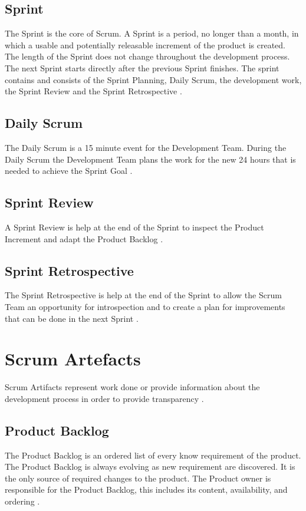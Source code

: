 \subsection{Sprint}
The Sprint is the core of Scrum. A Sprint is a period, no longer than a month, in which 
a usable and potentially releasable increment of the product is created. The length
of the Sprint does not change throughout the development process. The next Sprint 
starts directly after the previous Sprint finishes. The sprint contains and consists of the 
Sprint Planning, Daily Scrum, the development work, the Sprint Review and the 
Sprint Retrospective \parencite{TheScrumGuide}.

\subsection{Daily Scrum}
The Daily Scrum is a 15 minute event for the Development Team. During the Daily 
Scrum the Development Team plans the work for the new 24 hours that is needed
to achieve the Sprint Goal  \parencite{TheScrumGuide}.

\subsection{Sprint Review}
A Sprint Review is help at the end of the Sprint to inspect the Product Increment 
and adapt the Product Backlog  \parencite{TheScrumGuide}.

\subsection{Sprint Retrospective}
The Sprint Retrospective is help at the end of the Sprint to allow the Scrum Team
an opportunity for introspection and to create a plan for improvements that can be 
done in the next Sprint  \parencite{TheScrumGuide}.

\section{Scrum Artefacts}
Scrum Artifacts represent work done or provide information about the development 
process in order to provide transparency \parencite{TheScrumGuide}.

\subsection{Product Backlog}
The Product Backlog is an ordered list of every know requirement of the product.
The Product Backlog is always evolving as new requirement are discovered. It is 
the only source of required changes to the product. The Product owner is 
responsible for the Product Backlog, this includes its content, availability, 
and ordering \parencite{TheScrumGuide}.

